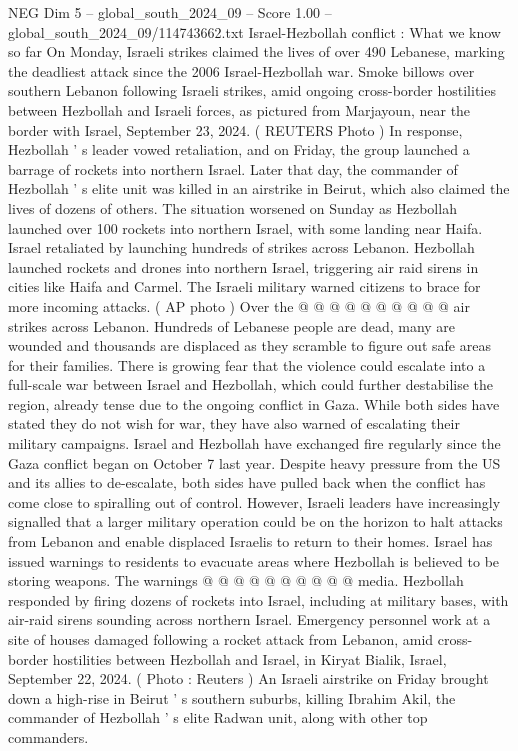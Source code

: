 \begin{textsample}{NEG Dim 5 – global\_south\_2024\_09 – Score 1.00 – global\_south\_2024\_09/114743662.txt}  \label{ex:f5_neg_229}
Israel-Hezbollah conflict : What we know so far On Monday, Israeli strikes claimed the lives of over 490 Lebanese, marking the deadliest attack since the 2006 Israel-Hezbollah war.
Smoke billows over southern Lebanon following Israeli strikes, amid ongoing cross-border hostilities between Hezbollah and Israeli forces, as pictured from Marjayoun, near the border with Israel, September 23, 2024. ( REUTERS Photo ) In response, Hezbollah ' s leader vowed retaliation, and on Friday, the group launched a barrage of rockets into northern Israel.
Later that day, the commander of Hezbollah ' s elite unit was killed in an airstrike in Beirut, which also claimed the lives of dozens of others.
The situation worsened on Sunday as Hezbollah launched over 100 rockets into northern Israel, with some landing near Haifa.
Israel retaliated by launching hundreds of strikes across Lebanon.
Hezbollah launched rockets and drones into northern Israel, triggering air raid sirens in cities like Haifa and Carmel.
The Israeli military warned citizens to brace for more incoming attacks. ( AP photo ) Over the @ @ @ @ @ @ @ @ @ @ air strikes across Lebanon.
Hundreds of Lebanese people are dead, many are wounded and thousands are displaced as they scramble to figure out safe areas for their families.
There is growing fear that the violence could escalate into a full-scale war between Israel and Hezbollah, which could further destabilise the region, already tense due to the ongoing conflict in Gaza.
While both sides have stated they do not wish for war, they have also warned of escalating their military campaigns.
Israel and Hezbollah have exchanged fire regularly since the Gaza conflict began on October 7 last year.
Despite heavy pressure from the US and its allies to de-escalate, both sides have pulled back when the conflict has come close to spiralling out of control.
However, Israeli leaders have increasingly signalled that a larger military operation could be on the horizon to halt attacks from Lebanon and enable displaced Israelis to return to their homes.
Israel has issued warnings to residents to evacuate areas where Hezbollah is believed to be storing weapons.
The warnings @ @ @ @ @ @ @ @ @ @ media.
Hezbollah responded by firing dozens of rockets into Israel, including at military bases, with air-raid sirens sounding across northern Israel.
Emergency personnel work at a site of houses damaged following a rocket attack from Lebanon, amid cross-border hostilities between Hezbollah and Israel, in Kiryat Bialik, Israel, September 22, 2024. ( Photo : Reuters ) An Israeli airstrike on Friday brought down a high-rise in Beirut ' s southern suburbs, killing Ibrahim Akil, the commander of Hezbollah ' s elite Radwan unit, along with other top commanders.

\end{textsample}
